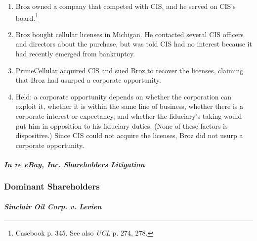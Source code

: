 \begin{enumerate}
    \item Broz owned a company that competed with CIS, and he served on CIS's 
    board.\footnote{Casebook p. 345. See also \emph{UCL} p. 274, 278.}
    \item Broz bought cellular licenses in Michigan. He contacted several CIS 
    officers and directors about the purchase, but was told CIS had no interest 
    because it had recently emerged from bankruptcy.
    \item PrimeCellular acquired CIS and sued Broz to recover the licenses, 
    claiming that Broz had usurped a corporate opportunity.
    \item Held: a corporate opportunity depends on whether the corporation can 
    exploit it, whether it is within the same line of business, whether there is 
    a corporate interest or expectancy, and whether the fiduciary's taking would 
    put him in opposition to his fiduciary duties. (None of these factors is 
    dispositive.) Since CIS could not acquire the licenses, Broz did not usurp a 
    corporate opportunity.
\end{enumerate}

\paragraph{\emph{In re eBay, Inc. Shareholders Litigation}}


\subsubsection{Dominant Shareholders}

\paragraph{\emph{Sinclair Oil Corp. v. Levien}}

